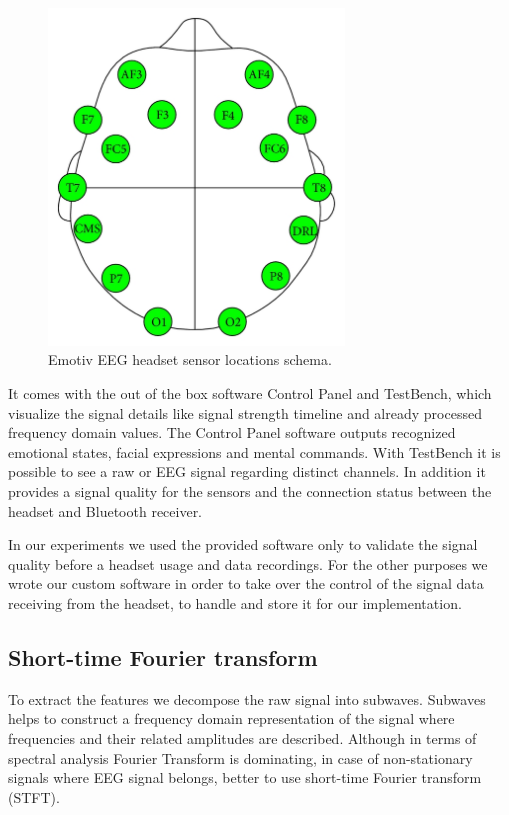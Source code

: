 \documentclass[12pt]{article}
\theoremstyle{definition}
\begin{document}
\begin{figure} [H]
\begin{center}
\includegraphics[width=0.7\textwidth]{emotiv_eeg}
\caption{Emotiv EEG headset sensor locations schema.~\protect\cite{emotiv_eeg_pic}}
\label{fig:emotiv_eeg}
\end{center}
\end{figure}

It comes with the out of the box software Control Panel and TestBench, which visualize the signal details like signal strength timeline and already processed frequency domain values. The Control Panel software outputs recognized emotional states, facial expressions and mental commands. With TestBench it is possible to see a raw or EEG signal regarding distinct channels. In addition it provides a signal quality for the sensors and the connection status between the headset and Bluetooth receiver.

In our experiments we used the provided software only to validate the signal quality before a headset usage and data recordings. For the other purposes we wrote our custom software in order to take over the control of the signal data receiving from the headset, to handle and store it for our implementation.

\subsection{Short-time Fourier transform}

To extract the features we decompose the raw signal into subwaves. Subwaves helps to construct a frequency domain representation of the signal where frequencies and their related amplitudes are described. Although in terms of spectral analysis Fourier Transform is dominating, in case of non-stationary signals where EEG signal belongs, better to use short-time Fourier transform (STFT). \cite{alfahoum_fft}
\end{document}
